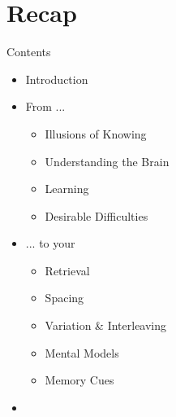 \documentclass{ercisbeamer}
\begin{document}
\section{Recap}
\begin{frame}{Contents}
    \begin{itemize}
        \item Introduction
        \item From ...
        \begin{itemize}
            \item Illusions of Knowing
            \item Understanding the Brain
            \item Learning
            \item Desirable Difficulties
        \end{itemize}
        \item ... to your 
        \begin{itemize}
            \item Retrieval
            \item Spacing
            \item Variation \& Interleaving
            \item Mental Models
            \item Memory Cues
        \end{itemize}
        \item {}
    \end{itemize}
\end{frame}
\end{document}
